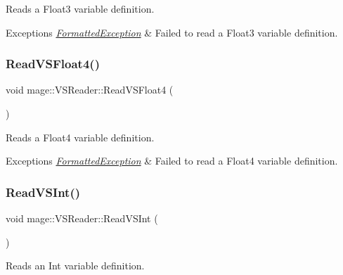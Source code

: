 Reads a Float3 variable definition.


\begin{DoxyExceptions}{Exceptions}
{\em \hyperlink{structmage_1_1_formatted_exception}{Formatted\+Exception}} & Failed to read a Float3 variable definition. \\
\hline
\end{DoxyExceptions}
\hypertarget{classmage_1_1_v_s_reader_aa1230cf0d6305f98172aabeacbfef8e0}{}\label{classmage_1_1_v_s_reader_aa1230cf0d6305f98172aabeacbfef8e0} 
\subsubsection{\texorpdfstring{Read\+V\+S\+Float4()}{ReadVSFloat4()}}
{\footnotesize\ttfamily void mage\+::\+V\+S\+Reader\+::\+Read\+V\+S\+Float4 (\begin{DoxyParamCaption}{ }\end{DoxyParamCaption})\hspace{0.3cm}{\ttfamily [private]}}

Reads a Float4 variable definition.


\begin{DoxyExceptions}{Exceptions}
{\em \hyperlink{structmage_1_1_formatted_exception}{Formatted\+Exception}} & Failed to read a Float4 variable definition. \\
\hline
\end{DoxyExceptions}
\hypertarget{classmage_1_1_v_s_reader_abbb6176a73ebddd88fc3ed58c89aa01a}{}\label{classmage_1_1_v_s_reader_abbb6176a73ebddd88fc3ed58c89aa01a} 
\subsubsection{\texorpdfstring{Read\+V\+S\+Int()}{ReadVSInt()}}
{\footnotesize\ttfamily void mage\+::\+V\+S\+Reader\+::\+Read\+V\+S\+Int (\begin{DoxyParamCaption}{ }\end{DoxyParamCaption})\hspace{0.3cm}{\ttfamily [private]}}

Reads an Int variable definition.


